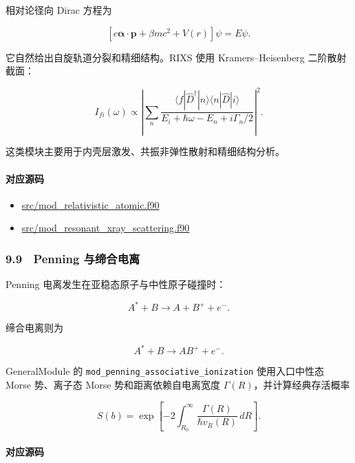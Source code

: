 \documentclass[
]{ctexbook}
\providecommand{\tightlist}{%
  \setlength{\itemsep}{0pt}\setlength{\parskip}{0pt}}
\begin{document}
相对论径向 Dirac 方程为

\[
\left[
c\boldsymbol{\alpha}\cdot\mathbf p
+
\beta mc^2
+
V(r)
\right]
\psi
=
E\psi.
\]

它自然给出自旋轨道分裂和精细结构。RIXS 使用 Kramers--Heisenberg
二阶散射截面：

\[
I_{fi}(\omega)
\propto
\left|
\sum_n
\frac{
\langle f|\hat D^{\dagger}|n\rangle
\langle n|\hat D|i\rangle
}
{E_i+\hbar\omega-E_n+i\Gamma_n/2}
\right|^2.
\]

这类模块主要用于内壳层激发、共振非弹性散射和精细结构分析。

\hypertarget{ux5bf9ux5e94ux6e90ux7801-46}{%
\paragraph{对应源码}\label{ux5bf9ux5e94ux6e90ux7801-46}}

\begin{itemize}
\tightlist
\item
  \href{https://github.com/l1Ha/QuantumGeneralModule/blob/main/src/mod_relativistic_atomic.f90}{src/mod\_relativistic\_atomic.f90}
\item
  \href{https://github.com/l1Ha/QuantumGeneralModule/blob/main/src/mod_resonant_xray_scattering.f90}{src/mod\_resonant\_xray\_scattering.f90}
\end{itemize}

\hypertarget{penning-ux4e0eux7f14ux5408ux7535ux79bb}{%
\subsubsection{9.9　Penning
与缔合电离}\label{penning-ux4e0eux7f14ux5408ux7535ux79bb}}

Penning 电离发生在亚稳态原子与中性原子碰撞时：

\[
A^{*}+B\rightarrow A+B^{+}+e^{-}.
\]

缔合电离则为

\[
A^{*}+B\rightarrow AB^{+}+e^{-}.
\]

GeneralModule 的 \texttt{mod\_penning\_associative\_ionization}
使用入口中性态 Morse 势、离子态 Morse 势和距离依赖自电离宽度
\(\Gamma(R)\)，并计算经典存活概率

\[
S(b)
=
\exp\left[
-2\int_{R_0}^{\infty}
\frac{\Gamma(R)}{\hbar v_R(R)}\,dR
\right].
\]

\hypertarget{ux5bf9ux5e94ux6e90ux7801-47}{%
\paragraph{对应源码}\label{ux5bf9ux5e94ux6e90ux7801-47}}
\end{document}
